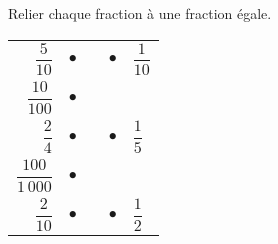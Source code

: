 \begin{exercice*}
   Relier chaque fraction à une fraction égale. \\ [2mm]
   \begin{tabular}{rcp{2cm}cp{2cm}}
      $\dfrac{5}{10}$ & $\bullet$ & & $\bullet$ & $\dfrac{1}{10}$ \\ [4mm]
      $\dfrac{10}{100}$ & $\bullet$ & & & \\ [4mm]
      $\dfrac{2}{4}$ & $\bullet$ & & $\bullet$ & $\dfrac{1}{5}$ \\ [4mm]
      $\dfrac{100}{1\,000}$ & $\bullet$ & & & \\ [4mm]
      $\dfrac{2}{10}$ & $\bullet$ & & $\bullet$ & $\dfrac{1}{2}$ \\
   \end{tabular}
\end{exercice*}